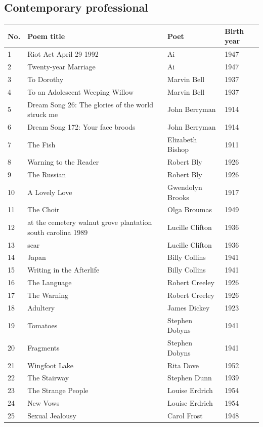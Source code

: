 \documentclass{book}
\begin{document}
\subsection*{Contemporary professional}
\begin{table}[h!]
\tiny
\begin{tabular}{llll}

\toprule
No. & Poem title & Poet & Birth year \\
\midrule
1 & Riot Act April 29 1992 & Ai & 1947 \\
2 & Twenty-year Marriage & Ai & 1947 \\
3 & To Dorothy & Marvin Bell & 1937 \\
4 & To an Adolescent Weeping Willow & Marvin Bell & 1937 \\
5 & Dream Song 26: The glories of the world struck me & John Berryman & 1914 \\
6 & Dream Song 172: Your face broods & John Berryman & 1914 \\
7 & The Fish & Elizabeth Bishop & 1911 \\
8 & Warning to the Reader & Robert Bly & 1926 \\
9 & The Russian & Robert Bly & 1926 \\
10 & A Lovely Love & Gwendolyn Brooks & 1917 \\
11 & The Choir & Olga Broumas & 1949 \\
12 & at the cemetery walnut grove plantation south carolina 1989 & Lucille Clifton & 1936 \\
13 & scar & Lucille Clifton & 1936 \\
14 & Japan & Billy Collins & 1941 \\
15 & Writing in the Afterlife & Billy Collins & 1941 \\
16 & The Language & Robert Creeley & 1926 \\
17 & The Warning & Robert Creeley & 1926 \\
18 & Adultery & James Dickey & 1923 \\
19 & Tomatoes & Stephen Dobyns & 1941 \\
20 & Fragments & Stephen Dobyns & 1941 \\
21 & Wingfoot Lake & Rita Dove & 1952 \\
22 & The Stairway & Stephen Dunn & 1939 \\
23 & The Strange People & Louise Erdrich & 1954 \\
24 & New Vows & Louise Erdrich & 1954 \\
25 & Sexual Jealousy & Carol Frost & 1948 \\

\end{tabular}
\end{table}
\end{document}
